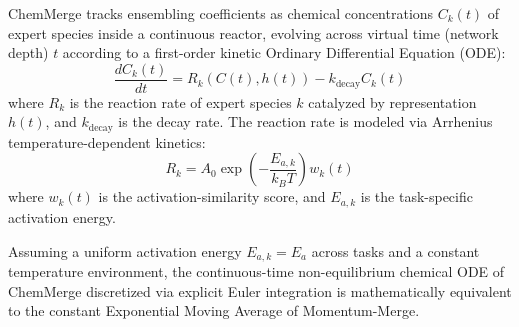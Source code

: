 ChemMerge tracks ensembling coefficients as chemical concentrations $C_k(t)$ of expert species inside a continuous reactor, evolving across virtual time (network depth) $t$ according to a first-order kinetic Ordinary Differential Equation (ODE):
\begin{equation}
    \frac{d C_k(t)}{dt} = R_k(C(t), h(t)) - k_{\text{decay}} C_k(t)
    \label{eq:chemmerge_ode}
\end{equation}
where $R_k$ is the reaction rate of expert species $k$ catalyzed by representation $h(t)$, and $k_{\text{decay}}$ is the decay rate. The reaction rate is modeled via Arrhenius temperature-dependent kinetics:
\begin{equation}
    R_k = A_0 \exp\left(-\frac{E_{a, k}}{k_B T}\right) w_k(t)
    \label{eq:arrhenius}
\end{equation}
where $w_k(t)$ is the activation-similarity score, and $E_{a, k}$ is the task-specific activation energy.

\begin{theorem}
Assuming a uniform activation energy $E_{a, k} = E_a$ across tasks and a constant temperature environment, the continuous-time non-equilibrium chemical ODE of ChemMerge discretized via explicit Euler integration is mathematically equivalent to the constant Exponential Moving Average of Momentum-Merge.
\label{thm:deconstruction}
\end{theorem}

